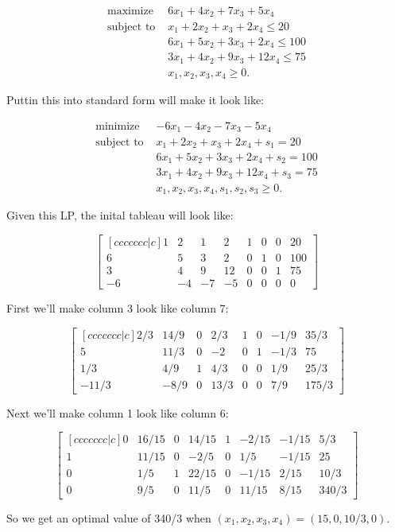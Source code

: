 \documentclass[12pt]{extarticle}
\theoremstyle{definition}
\begin{document}
\begin{problem} 

	\begin{align*}
	\text{maximize } &6x_1+4x_2+7x_3+5x_4\\
	\text{subject to } &x_1+2x_2+x_3+2x_4\leq 20\\
	&6x_1+5x_2+3x_3+2x_4\leq 100\\
	&3x_1+4x_2+9x_3+12x_4\leq 75\\
	&x_1, x_2, x_3, x_4\geq 0.
	\end{align*}

	Puttin this into standard form will make it look like:

	\begin{align*}
	\text{minimize } &-6x_1-4x_2-7x_3-5x_4\\
	\text{subject to } &x_1+2x_2+x_3+2x_4+s_1 = 20\\
	&6x_1+5x_2+3x_3+2x_4+s_2 = 100\\
	&3x_1+4x_2+9x_3+12x_4+s_3 = 75\\
	&x_1, x_2, x_3, x_4, s_1, s_2, s_3\geq 0.
	\end{align*}

	Given this LP, the inital tableau will look like:

	$$\begin{bmatrix}[ccccccc|c] 1&2&1&2&1&0&0&20\\ 6&5&3&2&0&1&0&100\\ 3&4&9&12&0&0&1&75\\ -6&-4&-7&-5&0&0&0&0 \end{bmatrix}$$

	First we'll make column 3 look like column 7:

	$$\begin{bmatrix}[ccccccc|c] 2/3&14/9&0&2/3&1&0&-1/9&35/3\\ 5&11/3&0&-2&0&1&-1/3&75\\ 
		1/3&4/9&1&4/3&0&0&1/9&25/3\\ -11/3&-8/9&0&13/3&0&0&7/9&175/3 \end{bmatrix}$$

	Next we'll make column 1 look like column 6:

	$$\begin{bmatrix}[ccccccc|c] 0&16/15&0&14/15&1&-2/15&-1/15&5/3\\ 1&11/15&0&-2/5&0&1/5&-1/15&25\\ 
		0&1/5&1&22/15&0&-1/15&2/15&10/3\\ 0&9/5&0&11/5&0&11/15&8/15&340/3 \end{bmatrix}$$

	So we get an optimal value of 340/3 when $(x_1,x_2,x_3,x_4)=(15,0,10/3,0)$.


\end{problem}
\end{document}
